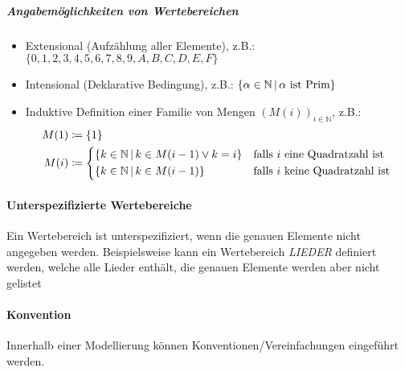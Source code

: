 		    \subparagraph{Angabemöglichkeiten von Wertebereichen}
		    \begin{itemize}
		    	\item Extensional (Aufzählung aller Elemente), z.B.: $ \{ 0, 1, 2, 3, 4, 5, 6, 7, 8, 9, A, B, C, D, E, F \} $
		    	\item Intensional (Deklarative Bedingung), z.B.: $ \{ \alpha \in \mathbb{N} \,\vert\, \alpha \text{ ist Prim} \} $
		    	\item Induktive Definition einer Familie von Mengen $ (M(i)) _ { i \in \mathbb{N} } $, z.B.:
			    	\begin{align*}
				    	M(1) &\coloneqq \{ 1 \} \\
				    	M(i) &\coloneqq \begin{cases*}
					    	\{ k \in \mathbb{N} \forwhich k \in M(i - 1) \lor k = i \} & \text{falls $ i $ eine Quadratzahl ist} \\
					    	\{ k \in \mathbb{N} \forwhich k \in M(i - 1) \} & \text{falls $ i $ keine Quadratzahl ist} \\
				    	\end{cases*} \\
			    	\end{align*}
		    \end{itemize}
		    
		    
	    
	    \paragraph{Unterspezifizierte Wertebereiche}
		    Ein Wertebereich ist unterspezifiziert, wenn die genauen Elemente nicht angegeben werden. Beispielsweise kann ein Wertebereich \textit{LIEDER} definiert werden, welche alle Lieder enthält, die genauen Elemente werden aber nicht gelistet
	    
	    \paragraph{Konvention}
		    Innerhalb einer Modellierung können Konventionen/Vereinfachungen eingeführt werden.
		    
